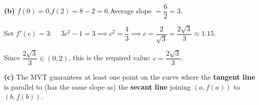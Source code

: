 \documentclass[addpoints]{exam}
\begin{document}
\begin{questions}
\begin{solution}[8cm]
\textbf{(b)} $f(0) = 0$,\quad $f(2) = 8 - 2 = 6$.\quad Average slope $= \dfrac{6}{2} = 3$.

Set $f'(c) = 3$: $\quad 3c^2 - 1 = 3 \implies c^2 = \dfrac{4}{3} \implies c = \dfrac{2}{\sqrt{3}}
= \dfrac{2\sqrt{3}}{3} \approx 1.15$.

Since $\dfrac{2\sqrt{3}}{3} \in (0,2)$, this is the required value: $\boxed{c = \dfrac{2\sqrt{3}}{3}}$.

\textbf{(c)} The MVT guarantees at least one point on the curve where the \textbf{tangent line}
is parallel to (has the same slope as) the \textbf{secant line} joining $(a, f(a))$ to
$(b, f(b))$.
\end{solution}

\end{questions}
\end{document}
